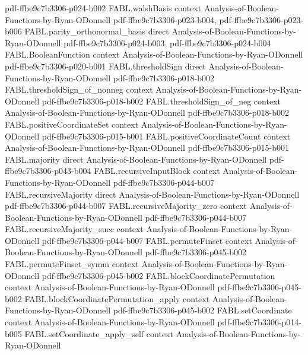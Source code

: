 \begin{theorem}
  {pdf-ffbe9c7b3306-p024-b002}
\proofstep
  {FABL.walshBasis}
  {context}
  {Analysis-of-Boolean-Functions-by-Ryan-ODonnell}
  {pdf-ffbe9c7b3306-p023-b004,
    pdf-ffbe9c7b3306-p023-b006}
\proofstep
  {FABL.parity_orthonormal_basis}
  {direct}
  {Analysis-of-Boolean-Functions-by-Ryan-ODonnell}
  {pdf-ffbe9c7b3306-p024-b003,
    pdf-ffbe9c7b3306-p024-b004}
\proofstep
  {FABL.BooleanFunction}
  {context}
  {Analysis-of-Boolean-Functions-by-Ryan-ODonnell}
  {pdf-ffbe9c7b3306-p020-b001}
\proofstep
  {FABL.thresholdSign}
  {direct}
  {Analysis-of-Boolean-Functions-by-Ryan-ODonnell}
  {pdf-ffbe9c7b3306-p018-b002}
\proofstep
  {FABL.thresholdSign_of_nonneg}
  {context}
  {Analysis-of-Boolean-Functions-by-Ryan-ODonnell}
  {pdf-ffbe9c7b3306-p018-b002}
\proofstep
  {FABL.thresholdSign_of_neg}
  {context}
  {Analysis-of-Boolean-Functions-by-Ryan-ODonnell}
  {pdf-ffbe9c7b3306-p018-b002}
\proofstep
  {FABL.positiveCoordinateSet}
  {context}
  {Analysis-of-Boolean-Functions-by-Ryan-ODonnell}
  {pdf-ffbe9c7b3306-p015-b001}
\proofstep
  {FABL.positiveCoordinateCount}
  {context}
  {Analysis-of-Boolean-Functions-by-Ryan-ODonnell}
  {pdf-ffbe9c7b3306-p015-b001}
\proofstep
  {FABL.majority}
  {direct}
  {Analysis-of-Boolean-Functions-by-Ryan-ODonnell}
  {pdf-ffbe9c7b3306-p043-b004}
\proofstep
  {FABL.recursiveInputBlock}
  {context}
  {Analysis-of-Boolean-Functions-by-Ryan-ODonnell}
  {pdf-ffbe9c7b3306-p044-b007}
\proofstep
  {FABL.recursiveMajority}
  {direct}
  {Analysis-of-Boolean-Functions-by-Ryan-ODonnell}
  {pdf-ffbe9c7b3306-p044-b007}
\proofstep
  {FABL.recursiveMajority_zero}
  {context}
  {Analysis-of-Boolean-Functions-by-Ryan-ODonnell}
  {pdf-ffbe9c7b3306-p044-b007}
\proofstep
  {FABL.recursiveMajority_succ}
  {context}
  {Analysis-of-Boolean-Functions-by-Ryan-ODonnell}
  {pdf-ffbe9c7b3306-p044-b007}
\proofstep
  {FABL.permuteFinset}
  {context}
  {Analysis-of-Boolean-Functions-by-Ryan-ODonnell}
  {pdf-ffbe9c7b3306-p045-b002}
\proofstep
  {FABL.permuteFinset_symm}
  {context}
  {Analysis-of-Boolean-Functions-by-Ryan-ODonnell}
  {pdf-ffbe9c7b3306-p045-b002}
\proofstep
  {FABL.blockCoordinatePermutation}
  {context}
  {Analysis-of-Boolean-Functions-by-Ryan-ODonnell}
  {pdf-ffbe9c7b3306-p045-b002}
\proofstep
  {FABL.blockCoordinatePermutation_apply}
  {context}
  {Analysis-of-Boolean-Functions-by-Ryan-ODonnell}
  {pdf-ffbe9c7b3306-p045-b002}
\proofstep
  {FABL.setCoordinate}
  {context}
  {Analysis-of-Boolean-Functions-by-Ryan-ODonnell}
  {pdf-ffbe9c7b3306-p014-b005}
\proofstep
  {FABL.setCoordinate_apply_self}
  {context}
  {Analysis-of-Boolean-Functions-by-Ryan-ODonnell}

\end{theorem}
